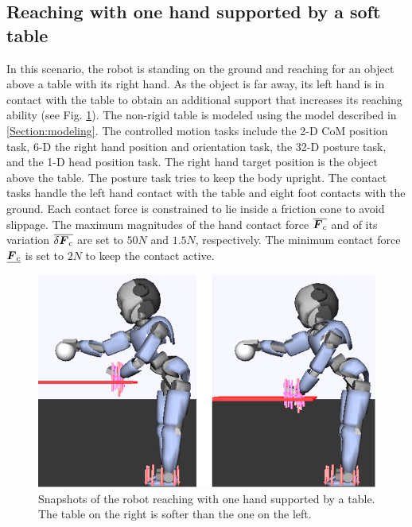 \documentclass[letterpaper, 10 pt, conference]{ieeeconf}  %
\newcommand{\vect}[1]{\mbox{\boldmath${#1}$}}%
\begin{document}
\subsection{Reaching with one hand supported by a soft table}
In this scenario, the robot is standing on the ground and reaching for an object above a table with its right hand. As the object is far away, its left hand is in contact with the table to obtain an additional support that increases its reaching ability (see Fig. \ref{reaching_table}). The non-rigid table is modeled using the model described in \ref{Section:modeling}. 
The controlled motion tasks include the 2-D CoM position task, 6-D the right hand position and orientation task, the 32-D posture task, and the 1-D head position task. The right hand target position is the object above the table. The posture task tries to keep the body upright. The contact tasks handle the left hand contact with the table and eight foot contacts with the ground. Each contact force is constrained to lie inside a friction cone to avoid slippage. The maximum magnitudes of the hand contact force $\overline{\vect{F}_c}$ and of its variation $\overline{\delta \vect{F}_c}$ are set to $50N$ and $1.5N$, respectively. The minimum contact force $\underline{\vect{F}_c}$ is set to $2N$ to keep the contact active.
\begin{figure}[!t]
\centering
\vspace{5pt}
\includegraphics[width=.75\linewidth]{../figure/reaching_different_k2.png}
\caption{Snapshots of the robot reaching with one hand supported by a table. The table on the right is softer than the one on the left.}
\label{reaching_table}
\end{figure}
\end{document}

